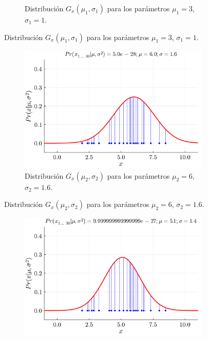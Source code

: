 \begin{enumerate}
\begin{solution}
\begin{figure}[H]
\begin{subfigure}{\textwidth}
                \caption{Distribución $G_{x}(\mu_1, \sigma_1)$ para los parámetros $\mu_1 = 3$, $\sigma_1 = 1$.}
                \label{fig:gaussiana_1}
            \end{subfigure}
        \end{figure}
        \begin{figure}[H]
            \ContinuedFloat
            \begin{subfigure}{\textwidth}
                \centering
                \includegraphics[scale=0.4]{../figures/dist_2.pdf}
                \caption{Distribución $G_{x}(\mu_2, \sigma_2)$ para los parámetros $\mu_2 = 6$, $\sigma_2 = 1.6$.}
                \label{fig:gaussiana_2}
            \end{subfigure}
        \end{figure}
        \begin{figure}[H]
            \ContinuedFloat
            \begin{subfigure}{\textwidth}
                \centering
                \includegraphics[scale=0.4]{../figures/dist_3.pdf}

\end{subfigure}
\end{figure}
\end{solution}
\end{enumerate}
